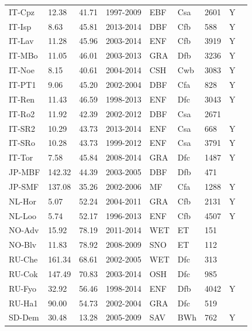 \documentclass[gmd, manuscript]{copernicus}
\begin{document}
\begin{table}
\begin{tabular}{lllllllll}
  IT-Cpz & 12.38 & 41.71 & 1997-2009 & EBF & Csa & 2601 & Y & \citet{IT-Cpz} \\ 
  IT-Isp & 8.63 & 45.81 & 2013-2014 & DBF & Cfb & 588 & Y & \citet{IT-Isp} \\ 
  IT-Lav & 11.28 & 45.96 & 2003-2014 & ENF & Cfb & 3919 & Y & \citet{IT-Lav} \\ 
  IT-MBo & 11.05 & 46.01 & 2003-2013 & GRA & Dfb & 3236 & Y & \citet{IT-MBo} \\ 
  IT-Noe & 8.15 & 40.61 & 2004-2014 & CSH & Cwb & 3083 & Y & \citet{IT-Noe} \\ 
  IT-PT1 & 9.06 & 45.20 & 2002-2004 & DBF & Cfa & 828 & Y & \citet{IT-PT1} \\ 
  IT-Ren & 11.43 & 46.59 & 1998-2013 & ENF & Dfc & 3043 & Y & \citet{IT-Ren} \\ 
  IT-Ro2 & 11.92 & 42.39 & 2002-2012 & DBF & Csa & 2671 &  & \citet{IT-Ro2} \\ 
  IT-SR2 & 10.29 & 43.73 & 2013-2014 & ENF & Csa & 668 & Y & \citet{IT-SR2} \\ 
  IT-SRo & 10.28 & 43.73 & 1999-2012 & ENF & Csa & 3791 & Y & \citet{IT-SRo} \\ 
  IT-Tor & 7.58 & 45.84 & 2008-2014 & GRA & Dfc & 1487 & Y & \citet{IT-Tor} \\ 
  JP-MBF & 142.32 & 44.39 & 2003-2005 & DBF & Dfb & 471 &  & \citet{JP-MBF} \\ 
  JP-SMF & 137.08 & 35.26 & 2002-2006 & MF & Cfa & 1288 & Y & \citet{JP-SMF} \\ 
  NL-Hor & 5.07 & 52.24 & 2004-2011 & GRA & Cfb & 2131 & Y & \citet{NL-Hor} \\ 
  NL-Loo & 5.74 & 52.17 & 1996-2013 & ENF & Cfb & 4507 & Y & \citet{NL-Loo} \\ 
  NO-Adv & 15.92 & 78.19 & 2011-2014 & WET & ET & 151 &  & \citet{NO-Adv} \\ 
  NO-Blv & 11.83 & 78.92 & 2008-2009 & SNO & ET & 112 &  & \citet{NO-Blv} \\ 
  RU-Che & 161.34 & 68.61 & 2002-2005 & WET & Dfc & 313 &  & \citet{RU-Che} \\ 
  RU-Cok & 147.49 & 70.83 & 2003-2014 & OSH & Dfc & 985 &  & \citet{RU-Cok} \\ 
  RU-Fyo & 32.92 & 56.46 & 1998-2014 & ENF & Dfb & 4042 & Y & \citet{RU-Fyo} \\ 
  RU-Ha1 & 90.00 & 54.73 & 2002-2004 & GRA & Dfc & 519 &  & \citet{RU-Ha1} \\ 
  SD-Dem & 30.48 & 13.28 & 2005-2009 & SAV & BWh & 762 & Y & \citet{SD-Dem} \\ 

\end{tabular}
\end{table}
\end{document}
